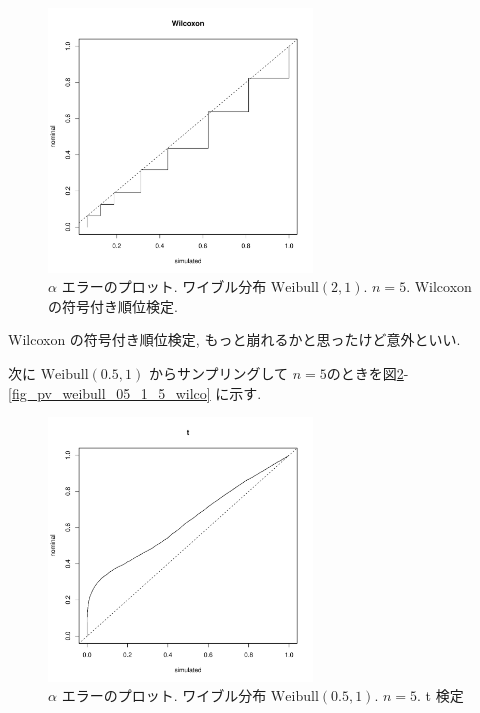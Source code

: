 \documentclass[12pt]{jsarticle}
\begin{document}
 \begin{figure}[htbp]
 \begin{center}
  \includegraphics[width=70mm]{img/pv_weibull_2_1_n5_wilco.pdf}
 \end{center}
       \caption{$\alpha$ エラーのプロット. ワイブル分布 $\mathrm{Weibull}(2,1)$. $n=5$. Wilcoxon の符号付き順位検定.}
  \label{fig_pv_weibull_2_1_5_wilco}
\end{figure}

Wilcoxon の符号付き順位検定, もっと崩れるかと思ったけど意外といい.

次に $\mathrm{Weibull}(0.5 ,1)$ からサンプリングして $n=5$のときを図\ref{fig_pv_weibull_05_1_5_t}-\ref{fig_pv_weibull_05_1_5_wilco} に示す.

\begin{figure}[htbp]
  \begin{center}
\includegraphics[width=70mm]{img/pv_weibull_05_1_n5_t.pdf}
  \end{center}
     \caption{$\alpha$ エラーのプロット. ワイブル分布 $\mathrm{Weibull}(0.5,1)$. $n=5$. t 検定}
  \label{fig_pv_weibull_05_1_5_t}
 \end{figure}
 
\end{document}
